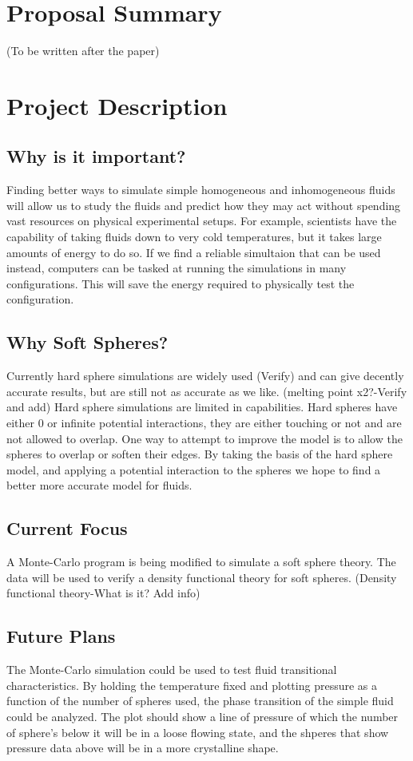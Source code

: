 \documentclass[a4paper,12pt]{article}
\begin{document}
\section*{Proposal Summary}
(To be written after the paper)

\section*{Project Description}

\subsection*{Why is it important?}
Finding better ways to simulate simple homogeneous and inhomogeneous
fluids will allow us to study the fluids and predict how they may act
without spending vast resources on physical experimental setups. For
example, scientists have the capability of taking fluids down to very
cold temperatures, but it takes large amounts of energy to do so. If
we find a reliable simultaion that can be used instead, computers can
be tasked at running the simulations in many configurations. This will
save the energy required to physically test the configuration.

\subsection*{Why Soft Spheres?}
Currently hard sphere simulations are widely used (Verify) and can
give decently accurate results, but are still not as accurate as we
like. (melting point x2?-Verify and add) Hard sphere simulations are
limited in capabilities. Hard spheres have either 0 or infinite
potential interactions, they are either touching or not and are not
allowed to overlap. One way to attempt to improve the model is to
allow the spheres to overlap or soften their edges. By taking the
basis of the hard sphere model, and applying a potential interaction
to the spheres we hope to find a better more accurate model for
fluids.

\subsection*{Current Focus}
A Monte-Carlo program is being modified to simulate a soft sphere
theory. The data will be used to verify a density functional theory
for soft spheres. (Density functional theory-What is it? Add info)

\subsection*{Future Plans}
The Monte-Carlo simulation could be used to test fluid transitional
characteristics. By holding the temperature fixed and plotting
pressure as a function of the number of spheres used, the phase
transition of the simple fluid could be analyzed. The plot should show
a line of pressure of which the number of sphere’s below it will be in
a loose flowing state, and the shperes that show pressure data above
will be in a more crystalline shape.
\end{document}
